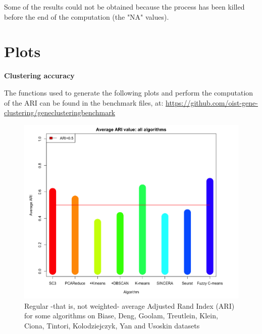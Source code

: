 \documentclass{report}
\begin{document}
{Some of the results could not be obtained because the process has been killed before the end of the computation (the "NA" values).

\section*{Plots}

\bigskip
\noindent \textbf{Clustering accuracy}
\bigskip

The functions used to generate the following plots and perform the computation of the ARI can be found in the benchmark files, at: {\url{https://github.com/oist-gene-clustering/geneclusteringbenchmark}}\\

\begin{figure}[H]
\centering
\includegraphics[scale=0.4]{benchmark/ariAverageAll.png}
\caption{Regular -that is, not weighted- average Adjusted Rand Index (ARI) for some algorithms on Biase, Deng, Goolam, Treutlein, Klein, Ciona, Tintori, Kolodziejczyk, Yan and Usoskin datasets}
\label{averageARI}
\end{figure}

}
\end{document}
